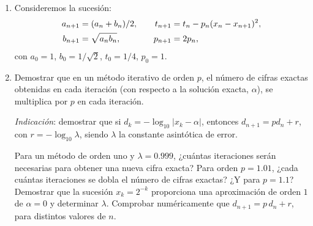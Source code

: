 \documentclass[11pt]{article}
\begin{document}

\begin{enumerate}
\item Consideremos la sucesión:
  \begin{align*}
    a_{n+1}&=(a_{n}+b_{n})/2 , &\quad
    t_{n+1}&=t_n - p_n(x_n -x_{n+1})^2, \\
    b_{n+1} &=\sqrt{a_{n}\*b_{n}}, 
    &\quad p_{n+1}&=2p_n,
  \end{align*}
con $a_0=1$, $b_0=1/\sqrt 2$, $t_0=1/4$, $p_0=1$.
\item Demostrar que en un método iterativo de orden $p$, el número de
  cifras exactas obtenidas en cada iteración (con respecto a la
  solución exacta, $\alpha$), se multiplica por $p$ en cada iteración.
  \begin{flushright}
    \scriptsize \textit{Indicación}: demostrar que si
    $d_k=-\log_{10}|x_k-\alpha|$, entonces $d_{n+1}=p d_n + r$, con
    $r=-\log_{10}\lambda$, siendo $\lambda$ la constante asintótica de error.
  \end{flushright}
  Para un método de orden uno y $\lambda=0.999$, ¿cuántas iteraciones
  serán necesarias para obtener una nueva cifra exacta? Para orden
  $p=1.01$, ¿cada cuántas iteraciones se dobla el número de cifras
  exactas? ¿Y para $p=1.1$? Demostrar que la sucesión $x_k=2^{-k}$
  proporciona una aproximación de orden $1$ de $\alpha=0$ y determinar
  $\lambda$. Comprobar numéricamente que $d_{n+1}=p\, d_n + r$, para
  distintos valores de $n$.
\end{enumerate}
\end{document}
